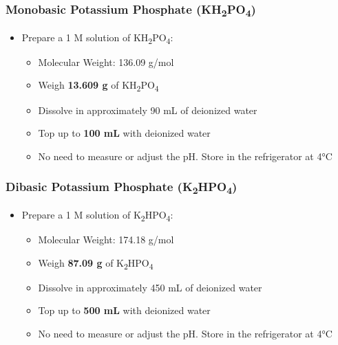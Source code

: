 \documentclass[
  9pt,
  american,
  a5paper,
  extrafontsizes,onecolumn,openright
  ]{memoir}
\providecommand{\tightlist}{%
  \setlength{\itemsep}{0pt}\setlength{\parskip}{0pt}}
\begin{document}
\subsubsection{\texorpdfstring{Monobasic Potassium Phosphate (KH\textsubscript{2}PO\textsubscript{4})}{Monobasic Potassium Phosphate (KH2PO4)}}\label{monobasic-potassium-phosphate-kh2po4}

\begin{itemize}
\tightlist
\item
  Prepare a 1 M solution of KH\textsubscript{2}PO\textsubscript{4}:

  \begin{itemize}
  \tightlist
  \item
    Molecular Weight: 136.09 g/mol
  \item
    Weigh \textbf{13.609 g} of KH\textsubscript{2}PO\textsubscript{4}
  \item
    Dissolve in approximately 90 mL of deionized water
  \item
    Top up to \textbf{100 mL} with deionized water
  \item
    No need to measure or adjust the pH. Store in the refrigerator at 4°C
  \end{itemize}
\end{itemize}

\subsubsection{\texorpdfstring{Dibasic Potassium Phosphate (K\textsubscript{2}HPO\textsubscript{4})}{Dibasic Potassium Phosphate (K2HPO4)}}\label{dibasic-potassium-phosphate-k2hpo4}

\begin{itemize}
\tightlist
\item
  Prepare a 1 M solution of K\textsubscript{2}HPO\textsubscript{4}:

  \begin{itemize}
  \tightlist
  \item
    Molecular Weight: 174.18 g/mol
  \item
    Weigh \textbf{87.09 g} of K\textsubscript{2}HPO\textsubscript{4}
  \item
    Dissolve in approximately 450 mL of deionized water
  \item
    Top up to \textbf{500 mL} with deionized water
  \item
    No need to measure or adjust the pH. Store in the refrigerator at 4°C
  \end{itemize}
\end{itemize}
\end{document}
